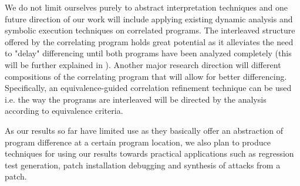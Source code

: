 We do not limit ourselves purely to abstract interpretation techniques and one future direction of our work will include applying existing dynamic analysis and symbolic execution techniques on correlated programs. The interleaved structure offered by the correlating program holds great potential as it alleviates the need to "delay" differencing until both programs have been analyzed completely (this will be further explained in ). Another major research direction will different compositions of the correlating program that will allow for better differencing. Specifically, an equivalence-guided correlation refinement technique can be used i.e. the way the programs are interleaved will be directed by the analysis according to equivalence criteria.

As our results so far have limited use as they basically offer an abstraction of program difference at a certain program location, we also plan to produce techniques for using our results towards practical applications such as regression test generation, patch installation debugging and synthesis of attacks from a patch.

